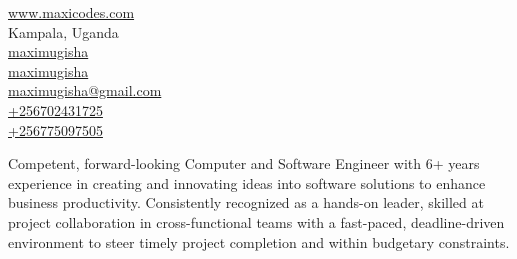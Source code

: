 \documentclass[]{plushcv}
\begin{document}
%
%


\begin{multicols}{2}
\color{BlueGreen}
{\faHome} \quad
{\href{https://www.maxicodes.com}{ www.maxicodes.com}} \\

{\faMapMarker} \quad
{Kampala, Uganda} \\

{\faGithub} \quad
{\href{https://www.github.com/maximugisha}{maximugisha}} \\

{\faLinkedin} \quad
{\href{https://www.linkedin.com/in/maximugisha}{maximugisha}} \\

{\faEnvelope} \quad
{\href{mailto:maximugisha@gmail.com} {maximugisha@gmail.com}} \\

{\faWhatsapp} \quad
{\href{tel:+256702431725}{+256702431725}} \\

{\faPhone} \quad
{\href{tel:+256775097505}{+256775097505}} \\
\end{multicols}

\vspace{\topsep}

{Competent, forward-looking Computer and Software Engineer with 6+ years experience in creating and  innovating ideas into software solutions to enhance business productivity. Consistently recognized as a hands-on leader, skilled at project collaboration in cross-functional teams with a fast-paced, deadline-driven environment to steer timely project completion and within budgetary constraints.}
\sectionsep
\sectionsep





\end{document}

